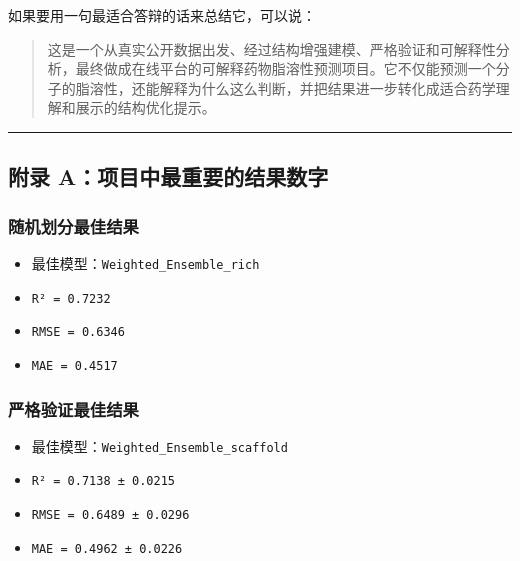 \documentclass[
  ,
]{ctexart}
\providecommand{\tightlist}{%
  \setlength{\itemsep}{0pt}\setlength{\parskip}{0pt}}
\begin{document}
如果要用一句最适合答辩的话来总结它，可以说：

\begin{quote}
这是一个从真实公开数据出发、经过结构增强建模、严格验证和可解释性分析，最终做成在线平台的可解释药物脂溶性预测项目。它不仅能预测一个分子的脂溶性，还能解释为什么这么判断，并把结果进一步转化成适合药学理解和展示的结构优化提示。
\end{quote}

\begin{center}\rule{0.5\linewidth}{0.5pt}\end{center}

\hypertarget{ux9644ux5f55-aux9879ux76eeux4e2dux6700ux91cdux8981ux7684ux7ed3ux679cux6570ux5b57}{%
\subsection{附录
A：项目中最重要的结果数字}\label{ux9644ux5f55-aux9879ux76eeux4e2dux6700ux91cdux8981ux7684ux7ed3ux679cux6570ux5b57}}

\hypertarget{ux968fux673aux5212ux5206ux6700ux4f73ux7ed3ux679c}{%
\subsubsection{随机划分最佳结果}\label{ux968fux673aux5212ux5206ux6700ux4f73ux7ed3ux679c}}

\begin{itemize}
\tightlist
\item
  最佳模型：\texttt{Weighted\_Ensemble\_rich}
\item
  \texttt{R²\ =\ 0.7232}
\item
  \texttt{RMSE\ =\ 0.6346}
\item
  \texttt{MAE\ =\ 0.4517}
\end{itemize}

\hypertarget{ux4e25ux683cux9a8cux8bc1ux6700ux4f73ux7ed3ux679c}{%
\subsubsection{严格验证最佳结果}\label{ux4e25ux683cux9a8cux8bc1ux6700ux4f73ux7ed3ux679c}}

\begin{itemize}
\tightlist
\item
  最佳模型：\texttt{Weighted\_Ensemble\_scaffold}
\item
  \texttt{R²\ =\ 0.7138\ ±\ 0.0215}
\item
  \texttt{RMSE\ =\ 0.6489\ ±\ 0.0296}
\item
  \texttt{MAE\ =\ 0.4962\ ±\ 0.0226}
\end{itemize}
\end{document}
